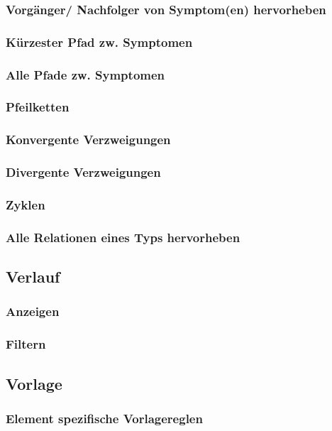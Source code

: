 \documentclass[enabledeprecatedfontcommands,fontsize=11pt,paper=a4,twoside]{scrartcl}
\newcounter{one}
\begin{document}
		\subsubsection{Vorgänger/ Nachfolger von Symptom(en) hervorheben}
		\subsubsection{Kürzester Pfad zw. Symptomen}
		\subsubsection{Alle Pfade zw. Symptomen}
		\subsubsection{Pfeilketten}
		\subsubsection{Konvergente Verzweigungen}
		\subsubsection{Divergente Verzweigungen}
		\subsubsection{Zyklen}
		\subsubsection{Alle Relationen eines Typs hervorheben}		
	\subsection{Verlauf} \label{logs}
		\subsubsection{Anzeigen}
		\subsubsection{Filtern}
	\subsection{Vorlage} \label{template}
		\subsubsection{Element spezifische Vorlagereglen}
\end{document}
